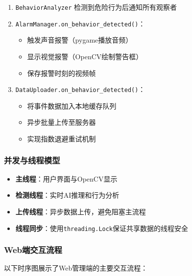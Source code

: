 \documentclass[a4paper,12pt]{article}
\begin{document}
\begin{itemize}
\begin{enumerate}
      \item \texttt{BehaviorAnalyzer} 检测到危险行为后通知所有观察者
      \item \texttt{AlarmManager.on\_behavior\_detected()}：
        \begin{itemize}
          \item 触发声音报警（pygame播放音频）
          \item 显示视觉报警（OpenCV绘制警告框）
          \item 保存报警时刻的视频帧
        \end{itemize}
      \item \texttt{DataUploader.on\_behavior\_detected()}：
        \begin{itemize}
          \item 将事件数据加入本地缓存队列
          \item 异步批量上传至服务器
          \item 实现指数退避重试机制
        \end{itemize}
    \end{enumerate}
\end{itemize}

\subsubsection{并发与线程模型}
\begin{itemize}
  \item \textbf{主线程}：用户界面与OpenCV显示
  \item \textbf{检测线程}：实时AI推理和行为分析
  \item \textbf{上传线程}：异步数据上传，避免阻塞主流程
  \item \textbf{线程同步}：使用\texttt{threading.Lock}保证共享数据的线程安全
\end{itemize}

\subsubsection{Web端交互流程}
以下时序图展示了Web管理端的主要交互流程：
\end{document}
